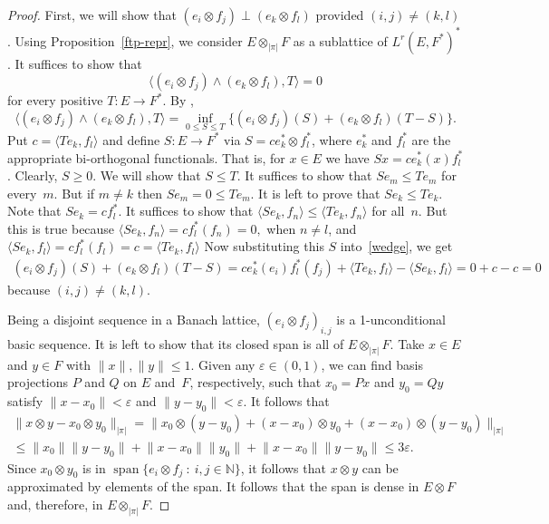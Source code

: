 \documentclass[12pt]{amsart}
\theoremstyle{plain}
\theoremstyle{definition}
\newcommand{\abs}[1]{\lvert#1\rvert}
\newcommand{\norm}[1]{\lVert#1\rVert}
\renewcommand{\le}{\leqslant}
\renewcommand{\ge}{\geqslant}
\renewcommand{\mid}{\::\:}
\def\api{{\abs{\!\pi\!}}}
\def\ftp{\otimes_{\!\scriptscriptstyle\api}\!}
\DeclareMathOperator{\Span}{span}
\begin{document}
\begin{proof}
  First, we will show that $(e_i\otimes f_j)\perp(e_k\otimes f_l)$
  provided $(i,j)\ne(k,l)$. Using Proposition~\ref{ftp-repr}, we
  consider $E\ftp F$ as a sublattice of $L^r(E,F^*)^*$. It suffices to
  show that
  \begin{displaymath}
    \bigl\langle(e_i\otimes f_j)\wedge(e_k\otimes f_l),T\bigr\rangle=0
  \end{displaymath}
  for every positive $T\colon E\to F^*$. By
  \cite[Theorem~3.49]{Aliprantis:06},
  \begin{equation}
    \label{wedge}
    \bigl\langle(e_i\otimes f_j)\wedge(e_k\otimes f_l),T\bigr\rangle=
    \inf\limits_{0\le S\le T}\bigl\{
       (e_i\otimes f_j)(S)+(e_k\otimes f_l)(T-S)\bigr\}.
  \end{equation}
  Put $c=\langle Te_k,f_l\rangle$ and define $S\colon E\to F^*$ via
  $S=ce^*_k\otimes f^*_l$, where $e^*_k$ and $f^*_l$ are the
  appropriate bi-orthogonal functionals. That is, for $x\in E$ we have
  $Sx=ce^*_k(x)f^*_l$.  Clearly, $S\ge 0$. We will show that $S\le T$.
  It suffices to show that $Se_m\le Te_m$ for every~$m$. But if $m\ne
  k$ then $Se_m=0\le Te_m$. It is left to prove that $Se_k\le Te_k$.
  Note that $Se_k=cf^*_l$. It suffices to show that $\langle
  Se_k,f_n\rangle\le\langle Te_k,f_n\rangle$ for all~$n$. But this is
  true because
  \begin{math}
    \langle Se_k,f_n\rangle=cf^*_l(f_n)=0,
  \end{math}
  when $n\ne l$, and
  \begin{math}
    \langle Se_k,f_l\rangle=cf^*_l(f_l)=c=\langle Te_k,f_l\rangle
  \end{math}
  Now substituting this $S$ into~\eqref{wedge}, we get
  \begin{multline*}
    (e_i\otimes f_j)(S)+(e_k\otimes f_l)(T-S)=
    ce_k^*(e_i)f^*_l(f_j)+
      \langle Te_k,f_l\rangle-\langle Se_k,f_l\rangle
      =0+c-c=0
  \end{multline*}
  because $(i,j)\ne(k,l)$.

  Being a disjoint sequence in a Banach lattice, $(e_i\otimes
  f_j)_{i,j}$ is a 1-unconditional basic sequence. It is left to show
  that its closed span is all of $E\ftp F$.  Take $x\in E$ and $y\in
  F$ with $\norm{x},\norm{y}\le 1$. Given any $\varepsilon\in(0,1)$, we can
  find basis projections $P$ and $Q$ on $E$ and~$F$, respectively,
  such that $x_0=Px$ and $y_0=Qy$ satisfy $\norm{x-x_0}<\varepsilon$
  and $\norm{y-y_0}<\varepsilon$. It follows that
  \begin{multline*}
   \norm{x\otimes y-x_0\otimes y_0}_\api=
   \norm{x_0\otimes(y-y_0)+(x-x_0)\otimes y_0+(x-x_0)\otimes(y-y_0)}_\api\\
   \le\norm{x_0}\norm{y-y_0}+\norm{x-x_0}\norm{y_0}
       +\norm{x-x_0}\norm{y-y_0}
   \le 3\varepsilon.
  \end{multline*}
  Since $x_0\otimes y_0$ is in $\Span\{e_i\otimes f_j\mid
  i,j\in\mathbb N\}$, it follows that $x\otimes y$ can be approximated
  by elements of the span. It follows that the span is dense in
  $E\otimes F$ and, therefore, in $E\ftp F$.
\end{proof}
\end{document}

